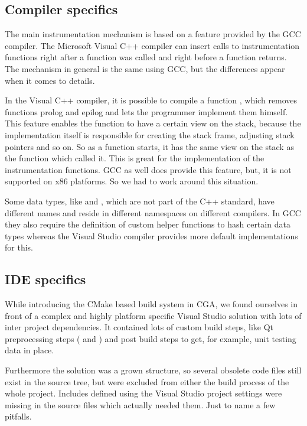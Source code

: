\subsection{Compiler specifics}

The main instrumentation mechanism is based on a feature provided by the GCC compiler.  The Microsoft Visual C++ compiler can insert calls to instrumentation functions right after a function was called and right before a function returns. The mechanism in general is the same using GCC, but the differences appear when it comes to details.

In the Visual C++ compiler, it is possible to compile a function , which removes functions prolog and epilog and lets the programmer implement them himself. This feature enables the function to have a certain view on the stack, because the implementation itself is responsible for creating the stack frame, adjusting stack pointers and so on. So as a  function starts, it has the same view on the stack as the function which called it. This is great for the implementation of the instrumentation functions. GCC as well does provide this feature, but, it is not supported on x86 platforms. So we had to work around this situation.

Some data types, like  and , which are not part of the C++ standard, have different names and reside in different namespaces on different compilers.  In GCC they also require the definition of custom helper functions to hash certain data types whereas the Visual Studio compiler provides more default implementations for this.

\subsection{IDE specifics}

While introducing the CMake based build system in CGA, we found ourselves in front of a complex and highly platform specific Visual Studio solution with lots of inter project dependencies. It contained lots of custom build steps, like Qt preprocessing steps ( and ) and post build steps to get, for example, unit testing data in place.

Furthermore the solution was a grown structure, so several obsolete code files still exist in the source tree, but were excluded from either the build process of the whole project.  Includes defined using the Visual Studio project settings were missing in the source files which actually needed them. Just to name a few pitfalls.

